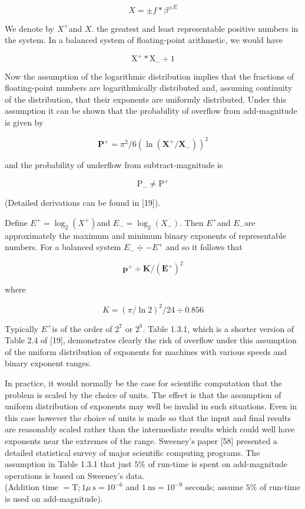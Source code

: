 \documentclass[10pt]{article}
\begin{document}
$$
X= \pm f * \beta^{ \pm E}
$$

We denote by $X^{+}$and $X$. the greatest and least representable positive numbers in the system. In a balanced system of floating-point arithmetic, we would have


\begin{equation*}
\mathrm{X}^{+} * \mathrm{X}_{-} \div 1 \tag{1.3.1}
\end{equation*}


Now the assumption of the logarithmic distribution implies that the fractions of floating-point numbers are logarithmically distributed and, assuming continuity of the distribution, that their exponents are uniformly distributed. Under this assumption it can be shown that the probability of overflow from add-magnitude is given by


\begin{equation*}
\mathbf{P}^{+}=\pi^{2} / 6\left(\ln \left(\mathbf{X}^{+} / \mathbf{X}_{-}\right)\right)^{2} \tag{1.3.2}
\end{equation*}


and the probability of underflow from subtract-magnitude is

$$
\mathrm{P}_{-} \neq \mathrm{P}^{+}
$$

(Detailed derivations can be found in [19]).

Define $E^{+}=\log _{2}\left(X^{+}\right)$and $E_{-}=\log _{2}\left(X_{-}\right)$. Then $E^{+}$and $E_{-}$are approximately the maximum and minimum binary exponents of representable numbers. For a balanced system $E_{-} \doteqdot-E^{+}$ and so it follows that


\begin{equation*}
\mathbf{p}^{+} \div \mathbf{K} /\left(\mathbf{E}^{+}\right)^{2} \tag{1.3.3}
\end{equation*}


where

$$
K=(\pi / \ln 2)^{2} / 24 \div 0.856
$$

Typically $E^{+}$is of the order of $2^{7}$ or $2^{8}$. Table 1.3.1, which is a shorter version of Table 2.4 of [19], demonstrates clearly the risk of overflow under this assumption of the uniform distribution of exponents for machines with various speeds and binary exponent ranges.

In practice, it would normally be the case for scientific computation that the problem is scaled by the choice of units. The effect is that the assumption of uniform distribution of exponents may well be invalid in such situations. Even in this case however the choice of units is made so that the input and final results are reasonably scaled rather than the intermediate results which could well have exponents near the extremes of the range. Sweeney's paper [58] presented a detailed statistical survey of major scientific computing programs. The assumption in Table 1.3.1 that just $5 \%$ of run-time is spent on add-magnitude operations is based on Sweeney's data.\\
(Addition time $=\mathrm{T} ; 1 \mu \mathrm{~s}=10^{-6}$ and $1 \mathrm{~ns}=10^{-9}$ seconds; assume $5 \%$ of run-time is used on add-magnitude).
\end{document}
